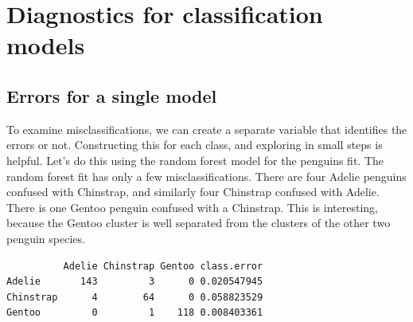 \documentclass[
  letterpaper,
]{krantz}
\newenvironment{Shaded}{\begin{snugshade}}{\end{snugshade}}
\newcommand{\AttributeTok}[1]{\textcolor[rgb]{0.40,0.45,0.13}{#1}}
\newcommand{\DecValTok}[1]{\textcolor[rgb]{0.68,0.00,0.00}{#1}}
\newcommand{\FunctionTok}[1]{\textcolor[rgb]{0.28,0.35,0.67}{#1}}
\newcommand{\NormalTok}[1]{\textcolor[rgb]{0.00,0.23,0.31}{#1}}
\newcommand{\OtherTok}[1]{\textcolor[rgb]{0.00,0.23,0.31}{#1}}
\newcommand{\SpecialCharTok}[1]{\textcolor[rgb]{0.37,0.37,0.37}{#1}}
\begin{document}
\chapter{Diagnostics for classification
models}\label{diagnostics-for-classification-models}


\section{Errors for a single model}\label{errors-for-a-single-model}

To examine misclassifications, we can create a separate variable that
identifies the errors or not. Constructing this for each class, and
exploring in small steps is helpful. Let's do this using the random
forest model for the penguins fit. The random forest fit has only a few
misclassifications. There are four Adelie penguins confused with
Chinstrap, and similarly four Chinstrap confused with Adelie. There is
one Gentoo penguin confused with a Chinstrap. This is interesting,
because the Gentoo cluster is well separated from the clusters of the
other two penguin species.


\begin{Shaded}
\end{Shaded}

\begin{verbatim}
          Adelie Chinstrap Gentoo class.error
Adelie       143         3      0 0.020547945
Chinstrap      4        64      0 0.058823529
Gentoo         0         1    118 0.008403361
\end{verbatim}

\begin{Shaded}
\end{Shaded}
\end{document}
